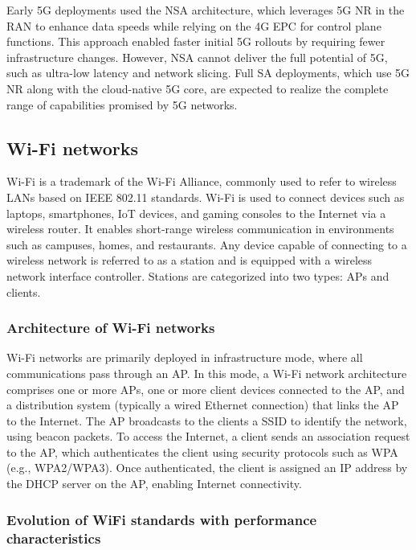 Early 5G deployments used the \ac{NSA} architecture, which leverages \ac{5G NR} in the RAN to enhance data speeds while relying on the 4G EPC for control plane functions. This approach enabled faster initial 5G rollouts by requiring fewer infrastructure changes. However, \ac{NSA} cannot deliver the full potential of 5G, such as ultra-low latency and network slicing. Full \ac{SA} deployments, which use 5G NR along with the cloud-native 5G core, are expected to realize the complete range of capabilities promised by 5G networks.



\subsection{Wi-Fi networks}

Wi-Fi is a trademark of the Wi-Fi Alliance, commonly used to refer to wireless \ac{LAN}s based on IEEE 802.11 standards. Wi-Fi is used to connect devices such as laptops, smartphones, \ac{IoT} devices, and gaming consoles to the Internet via a wireless router. It enables short-range wireless communication in environments such as campuses, homes, and restaurants. Any device capable of connecting to a wireless network is referred to as a station and is equipped with a wireless network interface controller. Stations are categorized into two types: \ac{AP}s and clients.



\subsubsection{Architecture of Wi-Fi networks}

Wi-Fi networks are primarily deployed in infrastructure mode, where all communications pass through an AP. In this mode, a Wi-Fi network architecture comprises one or more APs, one or more client devices connected to the AP, and a distribution system (typically a wired Ethernet connection) that links the AP to the Internet. The AP broadcasts to the clients a \ac{SSID} to identify the network, using beacon packets. To access the Internet, a client sends an association request to the AP, which authenticates the client using security protocols such as \ac{WPA} (e.g., WPA2/WPA3). Once authenticated, the client is assigned an IP address by the \ac{DHCP} server on the AP, enabling Internet connectivity.



\subsubsection{Evolution of WiFi standards with performance characteristics}

